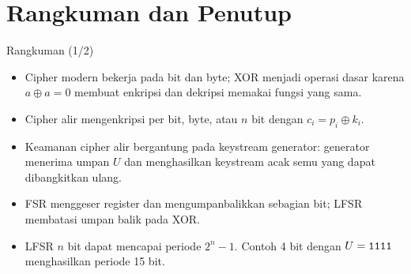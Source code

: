 \documentclass[aspectratio=169,11pt]{beamer}
\begin{document}
\section{Rangkuman dan Penutup}

\begin{frame}{Rangkuman (1/2)}
    \footnotesize
    \begin{itemize}
        \item Cipher modern bekerja pada bit dan byte; XOR menjadi operasi
              dasar karena $a\oplus a=0$ membuat enkripsi dan dekripsi
              memakai fungsi yang sama.
        \item Cipher alir mengenkripsi per bit, byte, atau $n$ bit dengan
              $c_i=p_i\oplus k_i$.
        \item Keamanan cipher alir bergantung pada keystream generator:
              generator menerima umpan $U$ dan menghasilkan keystream acak
              semu yang dapat dibangkitkan ulang.
        \item FSR menggeser register dan mengumpanbalikkan sebagian bit;
              LFSR membatasi umpan balik pada XOR.
        \item LFSR $n$ bit dapat mencapai periode $2^n-1$. Contoh 4 bit
              dengan $U=\texttt{1111}$ menghasilkan periode 15 bit.
    \end{itemize}
\end{frame}
\end{document}
